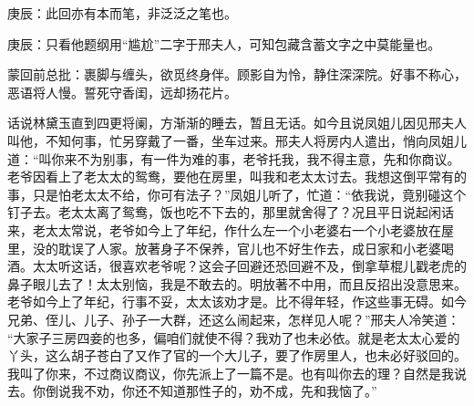 \begin{parag}
    \begin{note}庚辰：此回亦有本而笔，非泛泛之笔也。\end{note}
\end{parag}


\begin{parag}
    \begin{note}庚辰：只看他题纲用“尴尬”二字于邢夫人，可知包藏含蓄文字之中莫能量也。\end{note}
\end{parag}


\begin{parag}
    \begin{note}蒙回前总批：裹脚与缠头，欲觅终身伴。顾影自为怜，静住深深院。好事不称心，恶语将人慢。誓死守香闺，远却扬花片。\end{note}
\end{parag}


\begin{parag}
    话说林黛玉直到四更将阑，方渐渐的睡去，暂且无话。如今且说凤姐儿因见邢夫人叫他，不知何事，忙另穿戴了一番，坐车过来。邢夫人将房内人遣出，悄向凤姐儿道：“叫你来不为别事，有一件为难的事，老爷托我，我不得主意，先和你商议。老爷因看上了老太太的鸳鸯，要他在房里，叫我和老太太讨去。我想这倒平常有的事，只是怕老太太不给，你可有法子？”凤姐儿听了，忙道：“依我说，竟别碰这个钉子去。老太太离了鸳鸯，饭也吃不下去的，那里就舍得了？况且平日说起闲话来，老太太常说，老爷如今上了年纪，作什么左一个小老婆右一个小老婆放在屋里，没的耽误了人家。放著身子不保养，官儿也不好生作去，成日家和小老婆喝酒。太太听这话，很喜欢老爷呢？这会子回避还恐回避不及，倒拿草棍儿戳老虎的鼻子眼儿去了！太太别恼，我是不敢去的。明放著不中用，而且反招出没意思来。老爷如今上了年纪，行事不妥，太太该劝才是。比不得年轻，作这些事无碍。如今兄弟、侄儿、儿子、孙子一大群，还这么闹起来，怎样见人呢？”邢夫人冷笑道： “大家子三房四妾的也多，偏咱们就使不得？我劝了也未必依。就是老太太心爱的丫头，这么胡子苍白了又作了官的一个大儿子，要了作房里人，也未必好驳回的。我叫了你来，不过商议商议，你先派上了一篇不是。也有叫你去的理？自然是我说去。你倒说我不劝，你还不知道那性子的，劝不成，先和我恼了。”
\end{parag}


